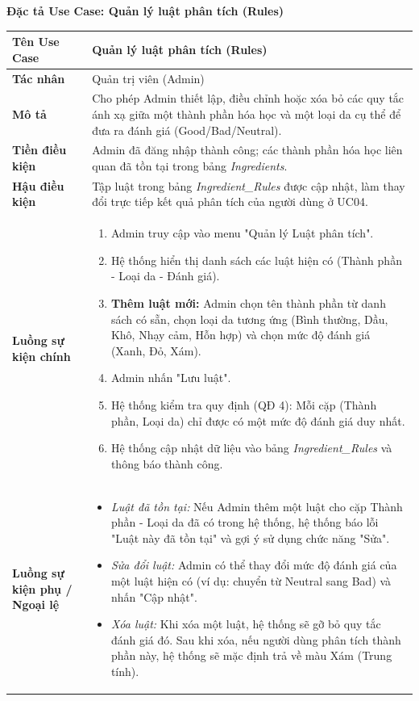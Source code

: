 \documentclass[12pt,a4paper]{article}
\begin{document}


\vspace{0.5cm}
\textbf{Đặc tả Use Case: Quản lý luật phân tích (Rules)}

\begin{center}
\renewcommand{\arraystretch}{1.4}
\begin{tabular}{|p{4cm}|p{10cm}|}
\hline
\rowcolor{blue!15}
\textbf{Tên Use Case} & \textbf{Quản lý luật phân tích (Rules)} \\ \hline
\textbf{Tác nhân} & Quản trị viên (Admin) \\ \hline
\textbf{Mô tả} & Cho phép Admin thiết lập, điều chỉnh hoặc xóa bỏ các quy tắc ánh xạ giữa một thành phần hóa học và một loại da cụ thể để đưa ra đánh giá (Good/Bad/Neutral). \\ \hline
\textbf{Tiền điều kiện} & Admin đã đăng nhập thành công; các thành phần hóa học liên quan đã tồn tại trong bảng \textit{Ingredients}. \\ \hline
\textbf{Hậu điều kiện} & Tập luật trong bảng \textit{Ingredient\_Rules} được cập nhật, làm thay đổi trực tiếp kết quả phân tích của người dùng ở UC04. \\ \hline
\textbf{Luồng sự kiện chính} & 
\begin{enumerate}
    \item Admin truy cập vào menu "Quản lý Luật phân tích".
    \item Hệ thống hiển thị danh sách các luật hiện có (Thành phần - Loại da - Đánh giá).
    \item \textbf{Thêm luật mới:} Admin chọn tên thành phần từ danh sách có sẵn, chọn loại da tương ứng (Bình thường, Dầu, Khô, Nhạy cảm, Hỗn hợp) và chọn mức độ đánh giá (Xanh, Đỏ, Xám).
    \item Admin nhấn "Lưu luật".
    \item Hệ thống kiểm tra quy định (QĐ 4): Mỗi cặp (Thành phần, Loại da) chỉ được có một mức độ đánh giá duy nhất.
    \item Hệ thống cập nhật dữ liệu vào bảng \textit{Ingredient\_Rules} và thông báo thành công.
\end{enumerate} \\ \hline
\textbf{Luồng sự kiện phụ / Ngoại lệ} & 
\begin{itemize}
    \item \textit{Luật đã tồn tại:} Nếu Admin thêm một luật cho cặp Thành phần - Loại da đã có trong hệ thống, hệ thống báo lỗi "Luật này đã tồn tại" và gợi ý sử dụng chức năng "Sửa".
    \item \textit{Sửa đổi luật:} Admin có thể thay đổi mức độ đánh giá của một luật hiện có (ví dụ: chuyển từ Neutral sang Bad) và nhấn "Cập nhật".
    \item \textit{Xóa luật:} Khi xóa một luật, hệ thống sẽ gỡ bỏ quy tắc đánh giá đó. Sau khi xóa, nếu người dùng phân tích thành phần này, hệ thống sẽ mặc định trả về màu Xám (Trung tính).
\end{itemize} \\ \hline
\end{tabular}
\end{center}
\end{document}

